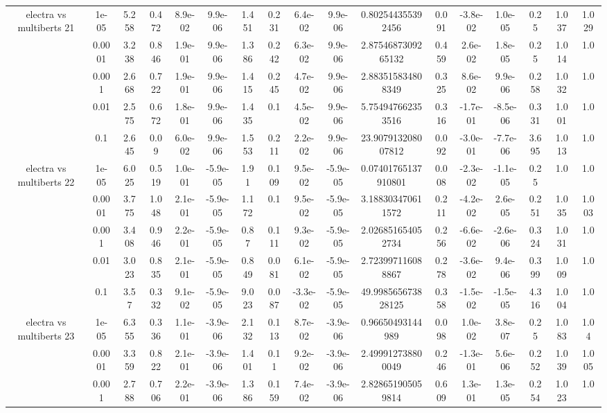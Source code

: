 \begin{tabular}{|c|c|c|c|c|c|c|c|c|c|c|c|c|c|c|c|c|}
\hline
\multirow{5}{*}{electra  vs multiberts 21} & 1e-05 & 5.258 & 0.472 & 8.9e-02 & 9.9e-06 & 1.451 & 0.231 & 6.4e-02 & 9.9e-06 & 0.802544355392456 & 0.091 & -3.8e-02 & 1.0e-05 & 0.25 & 1.037 & 1.029 \\
 & 0.0001 & 3.238 & 0.846 & 1.9e-01 & 9.9e-06 & 1.386 & 0.242 & 6.3e-02 & 9.9e-06 & 2.8754687309265132 & 0.459 & 2.6e-02 & 1.8e-05 & 0.25 & 1.014 & 1.0 \\
 & 0.001 & 2.668 & 0.722 & 1.9e-01 & 9.9e-06 & 1.415 & 0.245 & 4.7e-02 & 9.9e-06 & 2.883515834808349 & 0.325 & 8.6e-02 & 9.9e-06 & 0.258 & 1.032 & 1.0 \\
 & 0.01 & 2.575 & 0.672 & 1.8e-01 & 9.9e-06 & 1.435 & 0.1 & 4.5e-02 & 9.9e-06 & 5.754947662353516 & 0.316 & -1.7e-01 & -8.5e-06 & 0.331 & 1.001 & 1.0 \\
 & 0.1 & 2.645 & 0.09 & 6.0e-02 & 9.9e-06 & 1.553 & 0.211 & 2.2e-02 & 9.9e-06 & 23.907913208007812 & 0.092 & -3.0e-01 & -7.7e-06 & 3.695 & 1.013 & 1.0 \\
\hline
\multirow{5}{*}{electra  vs multiberts 22} & 1e-05 & 6.025 & 0.519 & 1.0e-01 & -5.9e-05 & 1.91 & 0.109 & 9.5e-02 & -5.9e-05 & 0.07401765137910801 & 0.008 & -2.3e-02 & -1.1e-05 & 0.25 & 1.0 & 1.0 \\
 & 0.0001 & 3.775 & 1.048 & 2.1e-01 & -5.9e-05 & 1.172 & 0.1 & 9.5e-02 & -5.9e-05 & 3.188303470611572 & 0.211 & -4.2e-02 & 2.6e-05 & 0.251 & 1.035 & 1.003 \\
 & 0.001 & 3.408 & 0.946 & 2.2e-01 & -5.9e-05 & 0.87 & 0.111 & 9.3e-02 & -5.9e-05 & 2.026851654052734 & 0.256 & -6.6e-02 & -2.6e-06 & 0.324 & 1.031 & 1.0 \\
 & 0.01 & 3.023 & 0.835 & 2.1e-01 & -5.9e-05 & 0.849 & 0.081 & 6.1e-02 & -5.9e-05 & 2.723997116088867 & 0.278 & -3.6e-02 & 9.4e-06 & 0.399 & 1.009 & 1.0 \\
 & 0.1 & 3.57 & 0.332 & 9.1e-02 & -5.9e-05 & 9.023 & 0.087 & -3.3e-02 & -5.9e-05 & 49.998565673828125 & 0.358 & -1.5e-02 & -1.5e-05 & 4.316 & 1.004 & 1.0 \\
\hline
\multirow{5}{*}{electra  vs multiberts 23} & 1e-05 & 6.355 & 0.336 & 1.1e-01 & -3.9e-06 & 2.132 & 0.113 & 8.7e-02 & -3.9e-06 & 0.96650493144989 & 0.098 & 1.0e-02 & 3.8e-07 & 0.25 & 1.083 & 1.04 \\
 & 0.0001 & 3.359 & 0.822 & 2.1e-01 & -3.9e-06 & 1.401 & 0.11 & 9.2e-02 & -3.9e-06 & 2.499912738800049 & 0.246 & -1.3e-01 & 5.6e-06 & 0.252 & 1.039 & 1.005 \\
 & 0.001 & 2.788 & 0.706 & 2.2e-01 & -3.9e-06 & 1.386 & 0.159 & 7.4e-02 & -3.9e-06 & 2.828651905059814 & 0.609 & 1.3e-01 & 1.3e-05 & 0.254 & 1.023 & 1.0 \\

\end{tabular}
